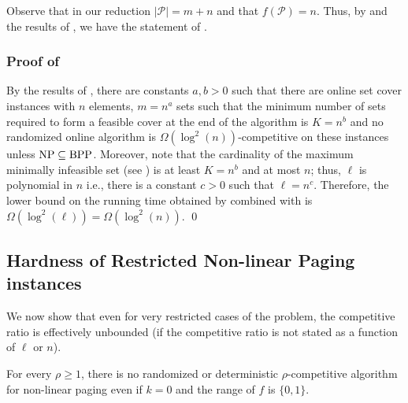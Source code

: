 \documentclass[11pt]{article}
\newcommand{\cP}{{\mathcal{P}}}
\begin{document}
Observe that in our reduction $|\cP| = m+n$ and that $f(\cP) = n$. Thus, by  and the results of \cite{alon2003online,korman2004use}, we have the statement of . %




\subsubsection*{Proof of }

By the results of \cite{korman2004use}, there are constants $a,b>0$ such that there are online set cover instances with $n$ elements, $m = n^a$ sets such that the minimum number of sets required to form a feasible cover at the end of the algorithm is $K = n^b$ and no randomized online algorithm is $\Omega(\log^2\left(n\right))$-competitive on these instances unless $\textnormal{NP}\subseteq \textnormal{BPP}$. Moreover, note that the cardinality of the maximum minimally infeasible set (see ) is at least $K = n^b$ and at most $n$; thus, $\ell$ is polynomial in $n$ i.e., there is a constant $c>0$ such that $\ell = n^c$. Therefore, the lower bound on the running time obtained by  combined with \cite{korman2004use} is $\Omega(\log^2\left(\ell\right)) = \Omega(\log^2\left(n\right))$. \qed


\subsection{Hardness of Restricted Non-linear Paging instances}
\label{sec:hardRestricted}

We now show that even for very restricted cases of the problem, the competitive ratio is effectively unbounded (if the competitive ratio is not stated as a function of $\ell$ or $n$). 

\begin{theorem}
\label{thm:HardnessRestricted}
For every $\rho \geq 1$, there is no randomized or deterministic $\rho$-competitive algorithm for \textnormal{non-linear paging} even if $k = 0$ and the range of $f$ is $\{0,1\}$.
\end{theorem}
\end{document}
